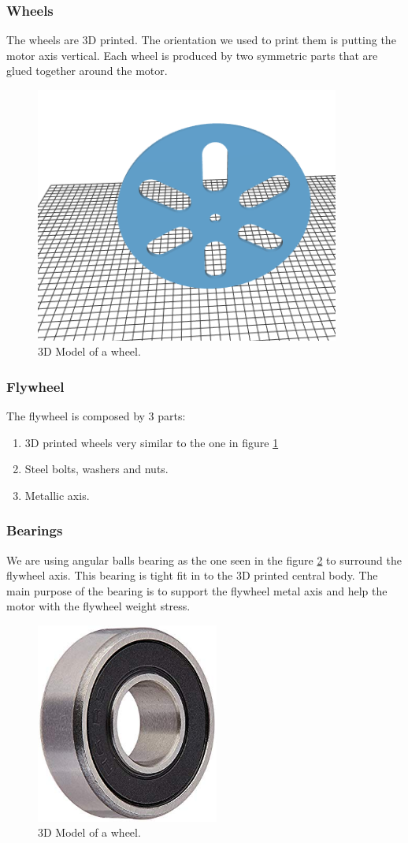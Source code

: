 \subsubsection{Wheels}
The wheels are 3D printed. The orientation we used to print them
is putting the motor axis vertical. Each wheel is produced by two
symmetric parts that are glued together around the motor.
\begin{figure}[H]
    \centering
    \includegraphics[width=10cm]{img/components/wheel.png}
    \caption{3D Model of a wheel.}
    \label{fig: 3D wheel}
\end{figure}
\subsubsection{Flywheel}
The flywheel is composed by 3 parts:
\begin{enumerate}
    \item 3D printed wheels very similar to the one in figure \ref{fig: 3D wheel}
    \item Steel bolts, washers and nuts.
    \item Metallic axis.
\end{enumerate}
\subsubsection{Bearings}
We are using angular balls bearing as the one seen in the figure 
\ref{fig: photo bearing} to surround the flywheel axis. This bearing is
tight fit in to the 3D printed central body. The main purpose of the bearing
is to support the flywheel metal axis and help the motor with the flywheel weight
stress.
\begin{figure}[H]
    \centering
    \includegraphics[width=6cm]{img/bearing.jpg}
    \caption{3D Model of a wheel.}
    \label{fig: photo bearing}
\end{figure}
